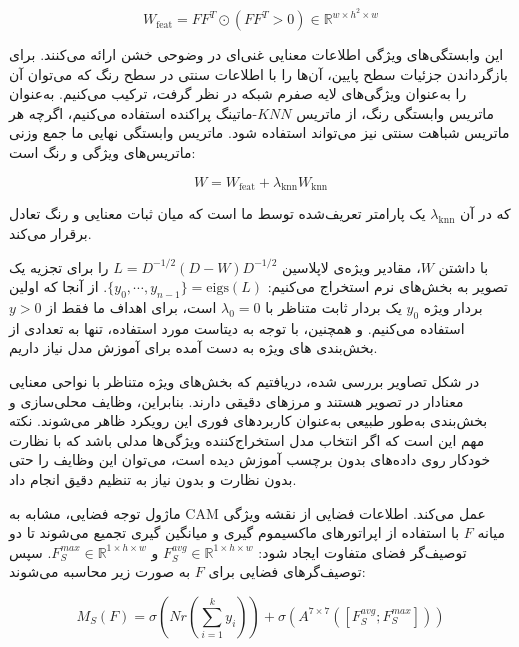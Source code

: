 \begin{equation}
W_{\text{feat}} = FF^T \odot (FF^T > 0) \in \mathbb{R}^{w \times h^2 \times w}
\end{equation}

این وابستگی‌های ویژگی اطلاعات معنایی غنی‌ای در وضوحی خشن ارائه می‌کنند. برای بازگرداندن جزئیات سطح پایین، آن‌ها را با اطلاعات سنتی در سطح رنگ که می‌توان آن را به‌عنوان ویژگی‌های لایه صفرم شبکه در نظر گرفت، ترکیب می‌کنیم.
   به‌عنوان ماتریس وابستگی رنگ، از ماتریس \(KNN\)-ماتینگ پراکنده استفاده می‌کنیم، اگرچه هر ماتریس شباهت سنتی نیز می‌تواند استفاده شود. ماتریس وابستگی نهایی ما جمع وزنی ماتریس‌های ویژگی و رنگ است:

\begin{equation}
W = W_{\text{feat}} + \lambda_{\text{knn}} W_{\text{knn}}
\end{equation}

که در آن \(\lambda_{\text{knn}}\) یک پارامتر تعریف‌شده توسط ما است که میان ثبات معنایی و رنگ تعادل برقرار می‌کند.

با داشتن \(W\)، مقادیر ویژه‌ی لاپلاسین \(L = D^{-1/2}(D - W)D^{-1/2}\) را برای تجزیه یک تصویر به بخش‌های نرم استخراج می‌کنیم: \(\{y_0, \cdots, y_{n-1}\} = \text{eigs}(L)\). از آنجا که اولین بردار ویژه \(y_0\) یک بردار ثابت متناظر با \(\lambda_0 = 0\) است، برای اهداف ما فقط از \(y > 0\) استفاده می‌کنیم. و همچنین، با توجه به دیتاست مورد استفاده، تنها به تعدادی از بخش‌بندی های ویژه به دست آمده برای آموزش مدل نیاز داریم.

در شکل تصاویر بررسی شده، دریافتیم که بخش‌های ویژه متناظر با نواحی معنایی معنادار در تصویر هستند و مرزهای دقیقی دارند. بنابراین، وظایف محلی‌سازی و بخش‌بندی به‌طور طبیعی به‌عنوان کاربردهای فوری این رویکرد ظاهر می‌شوند. نکته مهم این است که اگر انتخاب مدل استخراج‌کننده ویژگی‌ها مدلی باشد که با نظارت خودکار روی داده‌های بدون برچسب آموزش دیده است، می‌توان این وظایف را حتی بدون نظارت و بدون نیاز به تنظیم دقیق انجام داد.


ماژول توجه فضایی، مشابه به CAM عمل می‌کند. اطلاعات فضایی از نقشه ویژگی میانه \( F \) با استفاده از اپراتورهای ماکسیموم گیری و میانگین گیری تجمیع می‌شوند تا دو توصیف‌گر فضای متفاوت ایجاد شود: \( F_S^{avg} \in \mathbb{R}^{1 \times h \times w} \) و \( F_S^{max} \in \mathbb{R}^{1 \times h \times w} \). سپس توصیف‌گرهای فضایی برای \( F \) به صورت زیر محاسبه می‌شوند:

\begin{equation}
M_S(F) = \sigma(Nr(\sum_{i=1}^{k} y_i)) +  \sigma(A^{7 \times 7}([F_S^{avg}; F_S^{max}]))
\end{equation}

